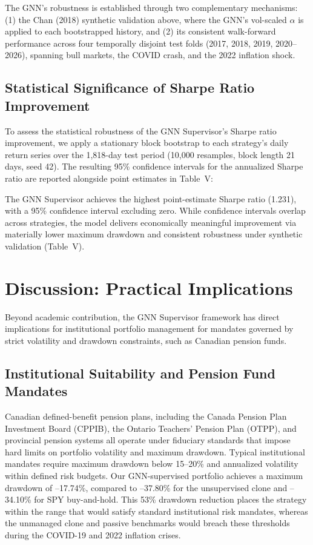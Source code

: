\documentclass[conferences]{IEEEtran}
\begin{document}
The GNN's robustness is established through two complementary mechanisms: (1) the Chan (2018) synthetic validation above, where the GNN's vol-scaled $\alpha$ is applied to each bootstrapped history, and (2) its consistent walk-forward performance across four temporally disjoint test folds (2017, 2018, 2019, 2020--2026), spanning bull markets, the COVID crash, and the 2022 inflation shock.

\subsection{Statistical Significance of Sharpe Ratio Improvement}

To assess the statistical robustness of the GNN Supervisor's Sharpe ratio improvement, we apply a stationary block bootstrap to each strategy's daily return series over the 1,818-day test period (10,000 resamples, block length 21 days, seed 42). The resulting 95\% confidence intervals for the annualized Sharpe ratio are reported alongside point estimates in Table~V:

\noindent The GNN Supervisor achieves the highest point-estimate Sharpe ratio (1.231), with a 95\% confidence interval excluding zero. While confidence intervals overlap across strategies, the model delivers economically meaningful improvement via materially lower maximum drawdown and consistent robustness under synthetic validation (Table~V).


\section{Discussion: Practical Implications}

Beyond academic contribution, the GNN Supervisor framework has direct implications for institutional portfolio management for mandates governed by strict volatility and drawdown constraints, such as Canadian pension funds.

\subsection{Institutional Suitability and Pension Fund Mandates}
Canadian defined-benefit pension plans, including the Canada Pension Plan Investment Board (CPPIB), the Ontario Teachers' Pension Plan (OTPP), and provincial pension systems all operate under fiduciary standards that impose hard limits on portfolio volatility and maximum drawdown. Typical institutional mandates require maximum drawdown below 15--20\% and annualized volatility within defined risk budgets. Our GNN-supervised portfolio achieves a maximum drawdown of --17.74\%, compared to --37.80\% for the unsupervised clone and --34.10\% for SPY buy-and-hold. This 53\% drawdown reduction places the strategy within the range that would satisfy standard institutional risk mandates, whereas the unmanaged clone and passive benchmarks would breach these thresholds during the COVID-19 and 2022 inflation crises.
\end{document}
